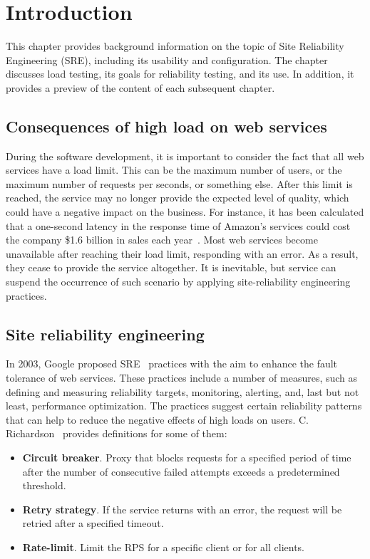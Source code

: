 \chapter{Introduction}
\label{ch:intro}

This chapter provides background information on the topic of Site Reliability Engineering (SRE), including its usability and configuration. The chapter discusses load testing, its goals for reliability testing, and its use. In addition, it provides a preview of the content of each subsequent chapter.


\section{Consequences of high load on web services}\label{sec:consequences-of-high-load-on-web-services}
During the software development, it is important to consider the fact that all web services have a load limit. This can be the maximum number of users, or the maximum number of requests per seconds, or something else. After this limit is reached, the service may no longer provide the expected level of quality, which could have a negative impact on the business. For instance, it has been calculated that a one-second latency in the response time of Amazon's services could cost the company \$1.6 billion in sales each year~\cite{one_second_article}.
Most web services become unavailable after reaching their load limit, responding with an error. As a result, they cease to provide the service altogether. It is inevitable, but service can suspend the occurrence of such scenario by applying site-reliability engineering practices.



\section{Site reliability engineering}\label{sec:site-reliability-engineering}
In 2003, Google proposed SRE~\cite{google_sre} practices with the aim to enhance the fault tolerance of web services. These practices include a number of measures, such as defining and measuring reliability targets, monitoring, alerting, and, last but not least, performance optimization. The practices suggest certain reliability patterns that can help to reduce the negative effects of high loads on users.
C. Richardson~\cite{microservices} provides definitions for some of them:
\begin{itemize}
    \item \textbf{Circuit breaker}. Proxy that blocks requests for a specified period of time after the number of consecutive failed attempts exceeds a predetermined threshold.
    \item \textbf{Retry strategy}. If the service returns with an error, the request will be retried after a specified timeout.
    \item \textbf{Rate-limit}. Limit the RPS for a specific client or for all clients.
\end{itemize}

